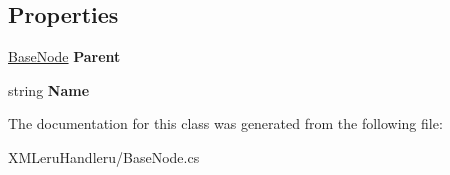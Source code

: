 \subsection*{Properties}
\begin{DoxyCompactItemize}
\item 
\hypertarget{class_x_m_leru_handleru_1_1_base_node_ac3c3e0c083a9da350e5511163668ac81}{}\hyperlink{class_x_m_leru_handleru_1_1_base_node}{Base\+Node} {\bfseries Parent}\label{class_x_m_leru_handleru_1_1_base_node_ac3c3e0c083a9da350e5511163668ac81}

\item 
\hypertarget{class_x_m_leru_handleru_1_1_base_node_a693bfdbaf05b7554897d475afd2f4768}{}string {\bfseries Name}\label{class_x_m_leru_handleru_1_1_base_node_a693bfdbaf05b7554897d475afd2f4768}

\end{DoxyCompactItemize}


The documentation for this class was generated from the following file\+:\begin{DoxyCompactItemize}
\item 
X\+M\+Leru\+Handleru/Base\+Node.\+cs\end{DoxyCompactItemize}
